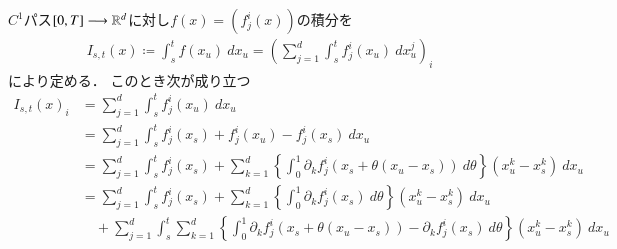 $C^1$パス$[0,T] \longrightarrow \mathbb{R}^d$に対し$f(x) = (f_j^i(x))$の積分を
\begin{align}
	I_{s,t} (x)
	\coloneqq \int_s^t f(x_u)\ dx_u
	= \left( \sum_{j=1}^d \int_s^t f_j^i(x_u)\ dx^j_u \right)_i
\end{align}
により定める．
このとき次が成り立つ
\begin{align}
	I_{s,t}(x)_i
	&= \sum_{j=1}^d \int_s^t f_j^i(x_u)\ dx_u \\
	&= \sum_{j=1}^d \int_s^t f_j^i(x_s) + f_j^i(x_u) - f_j^i(x_s)\ dx_u \\
	&= \sum_{j=1}^d \int_s^t f_j^i(x_s) 
		+ \sum_{k=1}^d  \left\{ \int_0^1 \partial_k f_j^i(x_s + \theta(x_u - x_s))\ d\theta \right\} (x^k_u - x^k_s)\ dx_u \\
	&= \sum_{j=1}^d \int_s^t f_j^i(x_s) + \sum_{k=1}^d  \left\{ \int_0^1 \partial_k f_j^i(x_s)\ d\theta \right\} (x^k_u - x^k_s)\ dx_u \\
		&\quad + \sum_{j=1}^d \int_s^t \sum_{k=1}^d  \left\{ \int_0^1 \partial_k f_j^i(x_s + \theta(x_u - x_s)) - \partial_k f_j^i(x_s)\ d\theta \right\} (x^k_u - x^k_s)\ dx_u \\
\end{align}